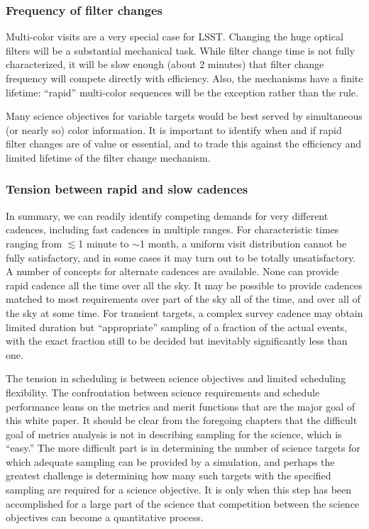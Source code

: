 \subsubsection{Frequency of filter changes}

Multi-color visits are a very special case for LSST.  Changing the
huge optical filters will be a substantial mechanical task.
While filter change time is not fully characterized, it will be slow
enough (about 2 minutes) that filter change frequency will compete directly
with efficiency. Also, the mechanisms have a finite lifetime: ``rapid''
multi-color sequences will be the exception rather than the rule.

Many science objectives for variable targets would be best served by
simultaneous (or nearly so) color information.   It is important to identify
when and if rapid filter changes are of value or essential, and to trade this
against the efficiency and limited lifetime of the filter change mechanism.


\subsubsection{Tension between rapid and slow cadences}

In summary, we can readily identify competing demands for very different
cadences, including fast cadences in multiple ranges. For characteristic
times ranging from  $\lesssim$1 minute to $\sim$1 month, a uniform visit
distribution cannot be fully satisfactory, and in some cases it may turn
out to be totally unsatisfactory.  A number of concepts for alternate
cadences are available.  None can provide rapid cadence all the time
over all the sky. It may be possible to provide cadences matched to most
requirements over part of the sky all of the time, and over all of the
sky at some time. For transient targets, a complex survey cadence may
obtain limited duration but ``appropriate'' sampling of a fraction of
the actual events, with the exact fraction still to be decided but
inevitably significantly less than one.

The tension in scheduling is between science objectives and limited
scheduling flexibility. The confrontation between science requirements
and schedule performance leans on the metrics and merit functions that
are the major goal of this white paper.  It should be clear from the
foregoing chapters that the difficult goal of metrics analysis is not in
describing sampling for the science, which is ``easy.''  The more
difficult part is in determining the number of science targets for which
adequate sampling can be provided by a simulation, and perhaps the
greatest challenge is determining how many such targets with the
specified sampling are required for a science objective.  It is only
when this step has been accomplished for a large part of the science
that competition between the science objectives can become a
quantitative process.

